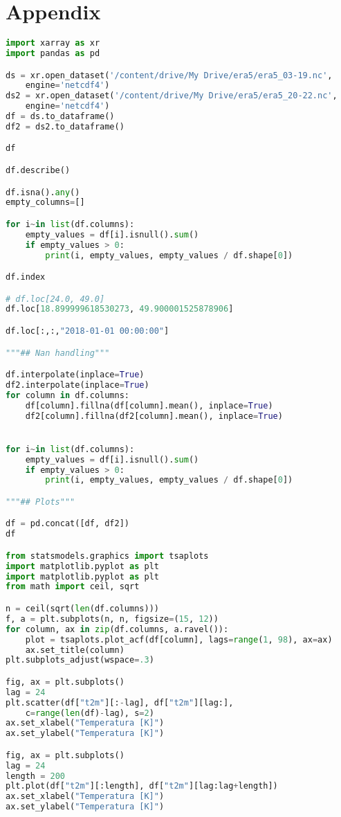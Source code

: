 \section*{Appendix}

\begin{lstlisting}[label=python-listing,caption={Kod źródłowy},language=python]
import xarray as xr
import pandas as pd

ds = xr.open_dataset('/content/drive/My Drive/era5/era5_03-19.nc', 
    engine='netcdf4')
ds2 = xr.open_dataset('/content/drive/My Drive/era5/era5_20-22.nc', 
    engine='netcdf4')
df = ds.to_dataframe()
df2 = ds2.to_dataframe()

df

df.describe()

df.isna().any()
empty_columns=[]

for i~in list(df.columns):
    empty_values = df[i].isnull().sum()
    if empty_values > 0:
        print(i, empty_values, empty_values / df.shape[0])

df.index

# df.loc[24.0, 49.0]
df.loc[18.899999618530273, 49.900001525878906]

df.loc[:,:,"2018-01-01 00:00:00"]

"""## Nan handling"""

df.interpolate(inplace=True)
df2.interpolate(inplace=True)
for column in df.columns:
    df[column].fillna(df[column].mean(), inplace=True)
    df2[column].fillna(df2[column].mean(), inplace=True)


for i~in list(df.columns):
    empty_values = df[i].isnull().sum()
    if empty_values > 0:
        print(i, empty_values, empty_values / df.shape[0])

"""## Plots"""

df = pd.concat([df, df2])
df

from statsmodels.graphics import tsaplots
import matplotlib.pyplot as plt
import matplotlib.pyplot as plt
from math import ceil, sqrt

n = ceil(sqrt(len(df.columns)))
f, a = plt.subplots(n, n, figsize=(15, 12))
for column, ax in zip(df.columns, a.ravel()):
    plot = tsaplots.plot_acf(df[column], lags=range(1, 98), ax=ax)
    ax.set_title(column)
plt.subplots_adjust(wspace=.3)

fig, ax = plt.subplots()
lag = 24
plt.scatter(df["t2m"][:-lag], df["t2m"][lag:], 
    c=range(len(df)-lag), s=2)
ax.set_xlabel("Temperatura [K]")
ax.set_ylabel("Temperatura [K]")

fig, ax = plt.subplots()
lag = 24
length = 200
plt.plot(df["t2m"][:length], df["t2m"][lag:lag+length])
ax.set_xlabel("Temperatura [K]")
ax.set_ylabel("Temperatura [K]")


\end{lstlisting}
